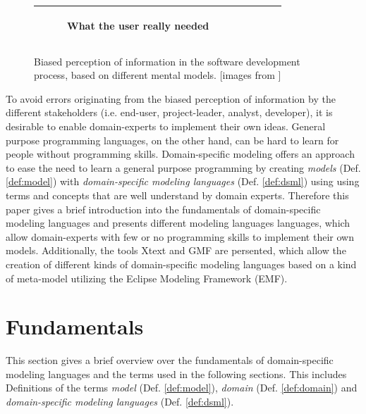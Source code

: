 \documentclass[runningheads,a4paper]{llncs}
\begin{document}
\begin{figure}[h]
\begin{center}
\begin{tabular}{|c|c|c|c|c|}
\begin{subfigure}[t]{0.15\textwidth}
\caption*{\tiny \centering What the user really needed}\label{fig:whatneeded}\end{subfigure}\\
\hline
\end{tabular}
\caption{Biased perception of information in the software development process, based on different mental models. [images from \cite{projectcartoon}]}
\label{fig:swingexample}
\end{center}
\end{figure}
To avoid errors originating from the biased perception of information by the different stakeholders (i.e. end-user, project-leader, analyst, developer), 
it is desirable to enable domain-experts to implement their own ideas.
General purpose programming languages, on the other hand, can be hard to learn for people without programming skills.
Domain-specific modeling offers an approach to ease the need to learn a general purpose programming
by creating \emph{models} (Def. \ref{def:model}) with \emph{domain-specific modeling languages} (Def. \ref{def:dsml})
using using terms and concepts that are well understand by domain experts.
Therefore this paper gives a brief introduction into the fundamentals of domain-specific modeling languages and presents
different  modeling languages languages, which allow domain-experts with few or no programming skills to implement their own models.
Additionally, the tools Xtext and GMF are persented, which allow the creation of different kinds of domain-specific modeling languages
based on a kind of meta-model utilizing the Eclipse Modeling Framework (EMF).


\section{Fundamentals}
\label{section:fundamentals}
This section gives a brief overview over the fundamentals of domain-specific modeling languages 
and the terms used in the following sections. This includes Definitions of the terms \emph{model} (Def. \ref{def:model}), 
\emph{domain} (Def. \ref{def:domain}) and \emph{domain-specific modeling languages} (Def. \ref{def:dsml}).
\end{document}
